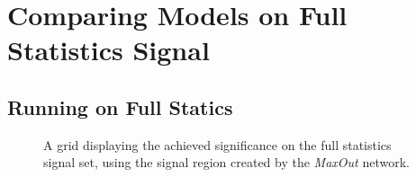 \section{Comparing Models on Full Statistics Signal}

\subsection{Running on Full Statics}

\begin{figure}
    \caption{A grid displaying the achieved significance on the full statistics signal set, using the signal region 
    created by the \emph{MaxOut} network.}
    \label{fig:MaxOutPCA_FS_MLMGridSig}
\end{figure}